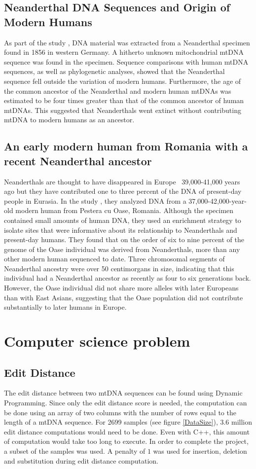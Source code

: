 \documentclass[conference]{IEEEtran}
\begin{document}
\subsection{Neanderthal DNA Sequences and Origin of Modern Humans}

As part of the study \cite{Neanderthals}, DNA material was extracted from a Neanderthal specimen found in 1856 in western Germany. A hitherto unknown mitochondrial mtDNA sequence was found in the specimen. Sequence comparisons with human mtDNA sequences, as well as phylogenetic analyses, showed that the Neanderthal sequence fell outside the variation of modern humans. Furthermore, the age of the common ancestor of the Neanderthal and modern human mtDNAs was estimated to be four times greater than that of the common ancestor of human mtDNAs. This suggested that Neanderthals went extinct without contributing mtDNA to modern humans as an ancestor.

\subsection{An early modern human from Romania with a recent Neanderthal ancestor}

Neanderthals are thought to have disappeared in Europe ~39,000-41,000 years ago but they have contributed one to three percent of the DNA of present-day people in Eurasia. In the study \cite{Romania}, they analyzed DNA from a 37,000-42,000-year-old modern human from Pestera cu Oase, Romania. Although the specimen contained small amounts of human DNA, they used an enrichment strategy to isolate sites that were informative about its relationship to Neanderthals and present-day humans. They found that on the order of six to nine percent of the genome of the Oase individual was derived from Neanderthals, more than any other modern human sequenced to date. Three chromosomal segments of Neanderthal ancestry were over 50 centimorgans in size, indicating that this individual had a Neanderthal ancestor as recently as four to six generations back. However, the Oase individual did not share more alleles with later Europeans than with East Asians, suggesting that the Oase population did not contribute substantially to later humans in Europe.

\FloatBarrier
\section{Computer science problem}
\subsection{Edit Distance}
The edit distance between two mtDNA sequences can be found using Dynamic Programming. Since only the edit distance score is needed, the computation can be done using an array of two columns with the number of rows equal to the length of a mtDNA sequence. For 2699 samples (see figure \ref{DataSize}), 3.6 million edit distance computations would need to be done. Even with C++, this amount of computation would take too long to execute. In order to complete the project, a subset of the samples was used. A penalty of $1$ was used for insertion, deletion and substitution during edit distance computation.
\end{document}
